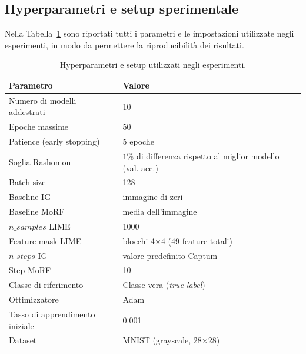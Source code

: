 \documentclass{article}
\begin{document}
\subsection{Hyperparametri e setup sperimentale}

Nella Tabella~\ref{tab:hyperparams} sono riportati tutti i parametri e le
impostazioni utilizzate negli esperimenti, in modo da permettere la
riproducibilità dei risultati.

\begin{table}[H]
      \centering
      \renewcommand{\arraystretch}{1.2}
      \begin{tabular}{ll}
            \hline
            \textbf{Parametro}              & \textbf{Valore}                                             \\
            \hline
            Numero di modelli addestrati    & 10                                                          \\
            Epoche massime                  & 50                                                          \\
            Patience (early stopping)       & 5 epoche                                                    \\
            Soglia Rashomon                 & $1\%$ di differenza rispetto al miglior modello (val. acc.) \\
            Batch size                      & 128                                                         \\
            Baseline IG                     & immagine di zeri                                            \\
            Baseline MoRF                   & media dell’immagine                                         \\
            $n\_samples$ LIME               & 1000                                                        \\
            Feature mask LIME               & blocchi 4×4 (49 feature totali)                             \\
            $n\_steps$ IG                   & valore predefinito Captum                                   \\
            Step MoRF                       & 10                                                          \\
            Classe di riferimento           & Classe vera (\textit{true label})                           \\
            Ottimizzatore                   & Adam                                                        \\
            Tasso di apprendimento iniziale & 0.001                                                       \\
            Dataset                         & MNIST (grayscale, 28×28)                                    \\
            \hline
      \end{tabular}
      \caption{Hyperparametri e setup utilizzati negli esperimenti.}
      \label{tab:hyperparams}
\end{table}
\end{document}
